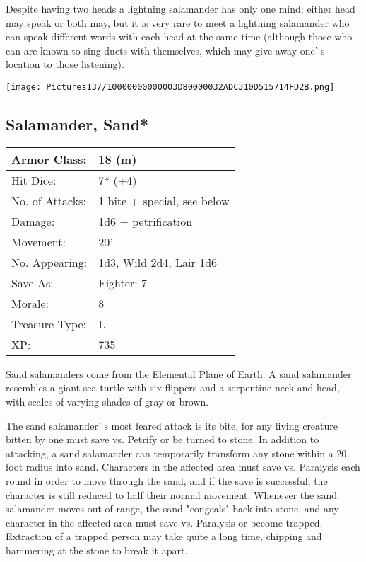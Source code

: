 \documentclass[a4paper,twoside,openany,10pt]{book}
\begin{document}
\begin{multicols}{2}
Despite having two heads a lightning salamander has only one mind; either head may speak or both may, but it is very rare to meet a lightning salamander who can speak different words with each head at the same time (although those who can are known to sing duets with themselves, which may give away one' s location to those listening).

\vfill

\begin{center} \texttt{[image: Pictures137/10000000000003D80000032ADC310D515714FD2B.png]} \end{center}


\subsection*{Salamander, Sand*}\label{salamander-sand}

\begin{tabularx}{0.50\textwidth}{@{}lX@{}}
Armor Class: & 18 (m) \\\hline
Hit Dice: & 7* (+4) \\\hline
No. of Attacks: & 1 bite + special, see below \\\hline
Damage: & 1d6 + petrification \\\hline
Movement: & 20' \\\hline
No. Appearing: & 1d3, Wild 2d4, Lair 1d6 \\\hline
Save As: & Fighter: 7 \\\hline
Morale: & 8 \\\hline
Treasure Type: & L \\\hline
XP: & 735 \\\hline
\end{tabularx}

Sand salamanders come from the Elemental Plane of Earth. A sand salamander resembles a giant sea turtle with six flippers and a serpentine neck and head, with scales of varying shades of gray or brown.

The sand salamander' s most feared attack is its bite, for any living creature bitten by one must save vs. Petrify or be turned to stone. In addition to attacking, a sand salamander can temporarily transform any stone within a 20 foot radius into sand. Characters in the affected area must save vs. Paralysis each round in order to move through the sand, and if the save is successful, the character is still reduced to half their normal movement. Whenever the sand salamander moves out of range, the sand "congeals" back into stone, and any character in the affected area must save vs. Paralysis or become trapped. Extraction of a trapped person may take quite a long time, chipping and hammering at the stone to break it apart.


\end{multicols}
\end{document}
